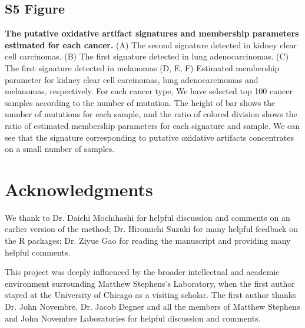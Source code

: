 \documentclass[10pt,letterpaper]{article}
\begin{document}
\subsection*{S5 Figure}
\label{oxidation}
{\bf The putative oxidative artifact signatures and membership parameters estimated for each cancer.}
(A) The second signature detected in kidney clear cell carcinomas.
(B) The first signature detected in lung adenocarcinomas.
(C) The first signature detected in melanomas
(D, E, F) Estimated membership parameter for kidney clear cell carcinomas, lung adenocarcinomas and melanomas, respectively.
For each cancer type, 
We have selected top 100 cancer samples according to the number of mutation.
The height of bar shows the number of mutations for each sample,
and the ratio of colored division shows the ratio of estimated membership parameters for each signature and sample.
We can see that the signature corresponding to putative oxidative artifacts concentrates on a small number of samples.

\section*{Acknowledgments}

We thank to Dr. Daichi Mochihashi for helpful discussion and comments on an earlier version of the method;
Dr. Hiromichi Suzuki for many helpful feedback on the R packages;
Dr. Ziyue Gao for reading the manuscript and providing many helpful comments.

This project was deeply influenced by the broader intellectual and academic environment surrounding Matthew Stephens's Laboratory,
when the first author stayed at the University of Chicago as a visiting scholar. The first author thanks Dr. John Novembre,
Dr. Jacob Degner and all the members of Matthew Stephens and John Novembre Laboratories for helpful discussion and comments.


\nolinenumbers


%
%
% 

% 


\end{document}
